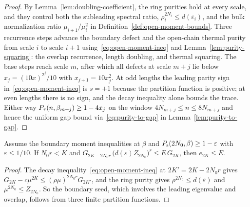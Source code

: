 \begin{proof}
  \leanok
  By Lemma~\ref{lem:doubling-coefficient}, the ring purities hold at every scale, and they control
  both the subleading spectral ratio, \(\rho_i^{2N_i} \le d(\varepsilon_i)\), and the bulk
  normalization ratio \(\mu_{i+1}/\mu_i^2\) in Definition~\ref{def:open-moment-bounds}. Three
  recurrence steps advance the boundary defect and the open-chain thermal purity from scale \(i\)
  to scale \(i + 1\) using~\eqref{eq:open-moment-ineq} and Lemma~\ref{lem:purity-squaring}: the
  overlap recurrence, length doubling, and thermal squaring. The base steps reach scale \(m\), after
  which all defects at scale \(m + j\) lie below \(x_j = (10x)^{2^j}/10\) with
  \(x_{j+1} = 10x_j^2\). At odd lengths the leading parity sign in~\eqref{eq:open-moment-ineq} is
  \(s = +1\) because the partition function is positive; at even lengths there is no sign, and the
  decay inequality alone bounds the trace. Either way \(P_{\tau}(n, \beta_{m+j}) \ge 1 - 4x_j\)
  on the window \(4N_{m+j} \le n \le 8N_{m+j}\) and hence the uniform gap bound
  via~\eqref{eq:purity-to-gap} in Lemma~\ref{lem:purity-to-gap}.
\end{proof}

\begin{lemma}
  \label{lem:boundary-seed-traces}
  \leanok
  Assume the boundary moment inequalities at \(\beta\) and \(P_{\mathrm{s}}(2N_0, \beta) \ge 1 - \varepsilon\)
  with \(\varepsilon \le 1/10\). If \(N_0 r < K\) and
  \(G_{2K - 2N_0 r}\,\bigl(d(\varepsilon) Z_{2N_0}\bigr)^r \le E\, G_{2K}\), then
  \(e_{2K} \le E\).
\end{lemma}
\begin{proof}
  \leanok
  The decay inequality~\eqref{eq:open-moment-ineq} at \(2K' = 2K - 2N_0 r\) gives
  \(G_{2K} - c\mu^{2K} \le (\rho\mu)^{2N_0 r} G_{2K'}\), and the ring purity gives
  \(\rho^{2N_0} \le d(\varepsilon)\) and \(\mu^{2N_0} \le Z_{2N_0}\). So the boundary seed, which
  involves the leading eigenvalue and overlap, follows from three finite partition functions.
\end{proof}

